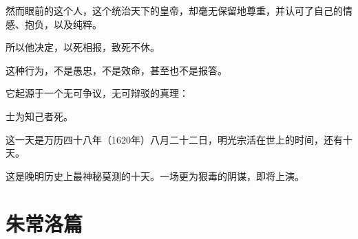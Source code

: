 \begin{multicols}{\theparacolNo}
		然而眼前的这个人，这个统治天下的皇帝，却毫无保留地尊重，并认可了自己的情感、抱负，以及纯粹。

		所以他决定，以死相报，致死不休。

		这种行为，不是愚忠，不是效命，甚至也不是报答。

		它起源于一个无可争议，无可辩驳的真理：

		士为知己者死。

		这一天是万历四十八年（1620年）八月二十二日，明光宗活在世上的时间，还有十天。

		这是晚明历史上最神秘莫测的十天。一场更为狠毒的阴谋，即将上演。
		\ifnum{}
	\end{multicols}
\fi
\newpage

\chapter*{朱常洛篇}
